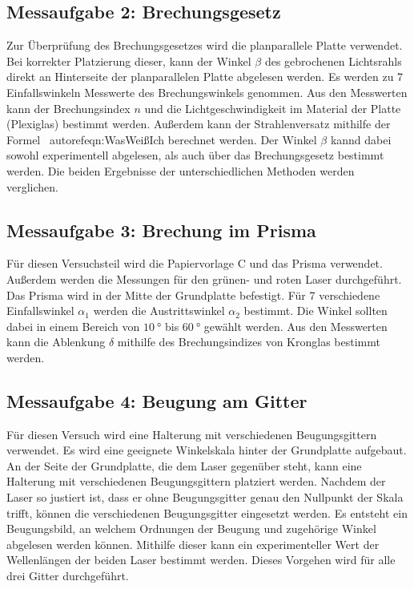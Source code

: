 \subsection{Messaufgabe 2: Brechungsgesetz}
\label{subsec:D_Brechung}
Zur Überprüfung des Brechungsgesetzes wird die planparallele Platte verwendet. Bei korrekter Platzierung dieser, kann der Winkel $\beta$ des gebrochenen Lichtsrahls direkt an Hinterseite
der planparallelen Platte abgelesen werden. Es werden zu 7 Einfallswinkeln Messwerte des Brechungswinkels genommen. Aus den Messwerten kann der Brechungsindex $n$ und die
Lichtgeschwindigkeit im Material der Platte (Plexiglas) bestimmt werden. Außerdem kann der Strahlenversatz mithilfe der Formel \ autoref{eqn:WasWeißIch} berechnet werden.
Der Winkel $\beta$ kannd dabei sowohl experimentell abgelesen, als auch über das Brechungsgesetz bestimmt werden. Die beiden Ergebnisse der unterschiedlichen Methoden werden 
verglichen.

\subsection{Messaufgabe 3: Brechung im Prisma}
\label{subsec:D_Prisma}
Für diesen Versuchsteil wird die Papiervorlage C und das Prisma verwendet. Außerdem werden die Messungen für den grünen- und roten Laser durchgeführt.
Das Prisma wird in der Mitte der Grundplatte befestigt. Für 7 verschiedene Einfallswinkel $\alpha_1$ werden die Austrittswinkel $\alpha_2$ bestimmt. Die Winkel
sollten dabei in einem Bereich von $\qty{10}{\degree}$ bis $\qty{60}{\degree}$ gewählt werden. Aus den Messwerten kann die Ablenkung $\delta$ mithilfe des Brechungsindizes 
von Kronglas bestimmt werden.

\subsection{Messaufgabe 4: Beugung am Gitter}
\label{subsec:D_Beugung}
Für diesen Versuch wird eine Halterung mit verschiedenen Beugungsgittern verwendet. Es wird eine geeignete Winkelskala hinter der Grundplatte aufgebaut. An der Seite der
Grundplatte, die dem Laser gegenüber steht, kann eine Halterung mit verschiedenen Beugungsgittern platziert werden. Nachdem der Laser so justiert ist, dass er ohne Beugungsgitter
genau den Nullpunkt der Skala trifft, können die verschiedenen Beugungsgitter eingesetzt werden.
Es entsteht ein Beugungsbild, an welchem Ordnungen der Beugung und zugehörige Winkel abgelesen werden können. Mithilfe dieser kann ein experimenteller Wert 
der Wellenlängen der beiden Laser bestimmt werden. Dieses Vorgehen wird für alle drei Gitter durchgeführt.

